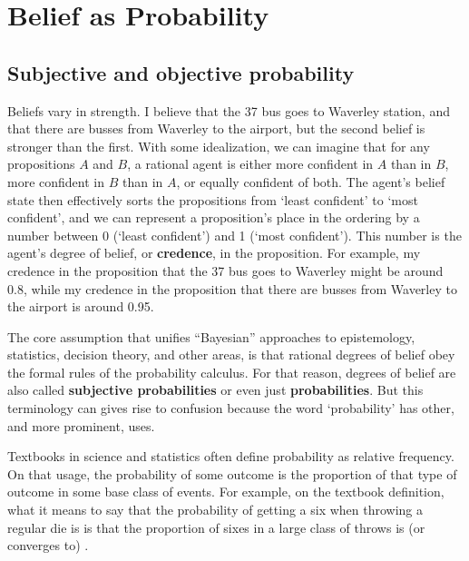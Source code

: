 \chapter{Belief as Probability}\label{ch:probability}




\section{Subjective and objective probability}

Beliefs vary in strength. I believe that the 37 bus goes to Waverley
station, and that there are busses from Waverley to the airport, but
the second belief is stronger than the first. With some idealization,
we can imagine that for any propositions $A$ and $B$, a rational agent
is either more confident in $A$ than in $B$, more confident in $B$
than in $A$, or equally confident of both. The agent's belief state
then effectively sorts the propositions from `least confident' to
`most confident', and we can represent a proposition's place in the
ordering by a number between 0 (`least confident') and 1 (`most
confident'). This number is the agent's degree of belief, or
\textbf{credence}, in the proposition. For example, my credence in the
proposition that the 37 bus goes to Waverley might be around 0.8,
while my credence in the proposition that there are busses from
Waverley to the airport is around 0.95.

The core assumption that unifies ``Bayesian'' approaches to
epistemology, statistics, decision theory, and other areas, is that
rational degrees of belief obey the formal rules of the probability
calculus. For that reason, degrees of belief are also called
\textbf{subjective probabilities} or even just \textbf{probabilities}.
But this terminology can gives rise to confusion because the word
`probability' has other, and more prominent, uses.

Textbooks in science and statistics often define probability as
relative frequency. On that usage, the probability of some outcome is
the proportion of that type of outcome in some base class of events.
For example, on the textbook definition, what it means to say that the
probability of getting a six when throwing a regular die is
 is that the proportion of sixes in a large class of
throws is (or converges to) .

